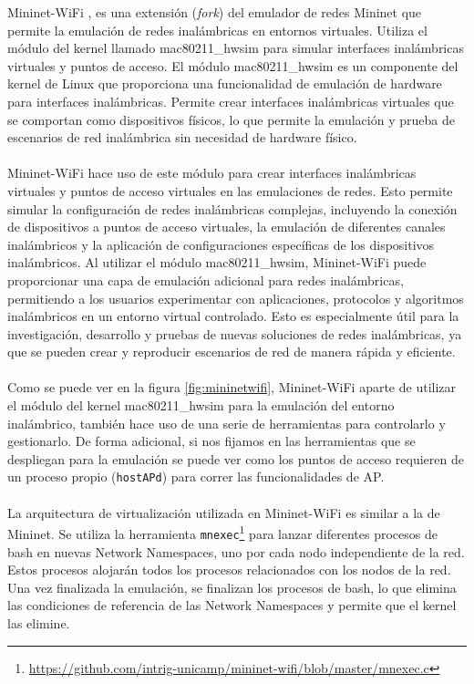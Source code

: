 Mininet-WiFi \cite{7367387}, es una extensión (\textit{fork}) del emulador de redes Mininet que permite la emulación de redes inalámbricas en entornos virtuales. Utiliza el módulo del kernel llamado mac80211\_hwsim para simular interfaces inalámbricas virtuales y puntos de acceso. El módulo mac80211\_hwsim es un componente del kernel de Linux que proporciona una funcionalidad de emulación de hardware para interfaces inalámbricas. Permite crear interfaces inalámbricas virtuales que se comportan como dispositivos físicos, lo que permite la emulación y prueba de escenarios de red inalámbrica sin necesidad de hardware físico.\\
\\
Mininet-WiFi hace uso de este módulo para crear interfaces inalámbricas virtuales y puntos de acceso virtuales en las emulaciones de redes. Esto permite simular la configuración de redes inalámbricas complejas, incluyendo la conexión de dispositivos a puntos de acceso virtuales, la emulación de diferentes canales inalámbricos y la aplicación de configuraciones específicas de los dispositivos inalámbricos. Al utilizar el módulo mac80211\_hwsim, Mininet-WiFi puede proporcionar una capa de emulación adicional para redes inalámbricas, permitiendo a los usuarios experimentar con aplicaciones, protocolos y algoritmos inalámbricos en un entorno virtual controlado. Esto es especialmente útil para la investigación, desarrollo y pruebas de nuevas soluciones de redes inalámbricas, ya que se pueden crear y reproducir escenarios de red de manera rápida y eficiente.\\
\\
Como se puede ver en la figura \ref{fig:mininetwifi}, Mininet-WiFi aparte de utilizar el módulo del kernel mac80211\_hwsim para la emulación del entorno inalámbrico, también hace uso de una serie de herramientas para controlarlo y gestionarlo. De forma adicional, si nos fijamos en las herramientas que se despliegan para la emulación se puede ver como los puntos de acceso requieren de un proceso propio (\texttt{hostAPd}) para correr las funcionalidades de AP.\\
\\
La arquitectura de virtualización utilizada en Mininet-WiFi es similar a la de Mininet. Se utiliza la herramienta \texttt{mnexec}\footnote{\url{https://github.com/intrig-unicamp/mininet-wifi/blob/master/mnexec.c}} para lanzar diferentes procesos de bash en nuevas Network Namespaces, uno por cada nodo independiente de la red. Estos procesos alojarán todos los procesos relacionados con los nodos de la red. Una vez finalizada la emulación, se finalizan los procesos de bash, lo que elimina las condiciones de referencia de las Network Namespaces y permite que el kernel las elimine.\\
